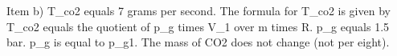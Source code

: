 Item b) T_co2 equals 7 grams per second.
The formula for T_co2 is given by T_co2 equals the quotient of p_g times V_1 over m times R.
p_g equals 1.5 bar.
p_g is equal to p_g1.
The mass of CO2 does not change (not per eight).